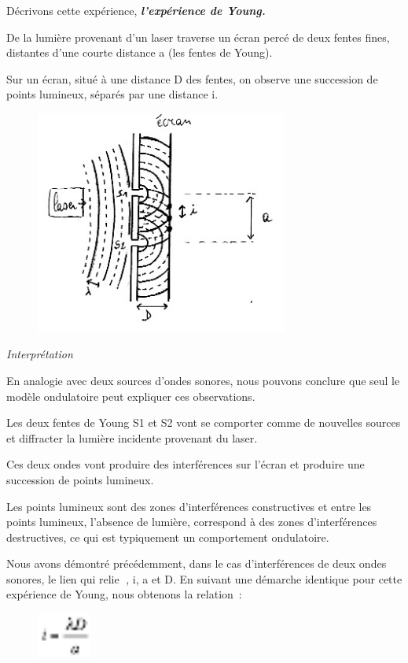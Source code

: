 Décrivons cette expérience, \emph{\textbf{l'expérience de Young.}}

De la lumière provenant d'un laser traverse un écran percé de deux
fentes fines, distantes d'une courte distance a (les fentes de Young).

Sur un écran, situé à une distance D des fentes, on observe une
succession de points lumineux, séparés par une distance i.

\begin{figure}
\centering
\includegraphics[width=8.299cm,height=7.35cm]{Pictures/10000001000001410000011C9E9E805F9A9605B7.png}
\caption{}
\end{figure}

\emph{Interprétation }

En analogie avec deux sources d'ondes sonores, nous pouvons conclure que
seul le modèle ondulatoire peut expliquer ces observations.

Les deux fentes de Young S1 et S2 vont se comporter comme de nouvelles
sources et diffracter la lumière incidente provenant du laser.

Ces deux ondes vont produire des interférences sur l'écran et produire
une succession de points lumineux.

Les points lumineux sont des zones d'interférences constructives et
entre les points lumineux, l'absence de lumière, correspond à des zones
d'interférences destructives, ce qui est typiquement un comportement
ondulatoire.

Nous avons démontré précédemment, dans le cas d'interférences de deux
ondes sonores, le lien qui relie , i, a et D. En suivant une démarche
identique pour cette expérience de Young, nous obtenons la relation~:

\begin{figure}
\centering
\includegraphics[width=1.788cm,height=1.46cm]{Pictures/100000010000001A00000015860A63C6525557ED.png}
\caption{}
\end{figure}


